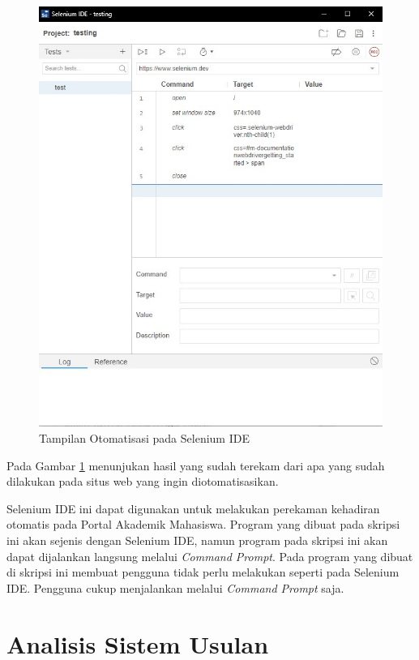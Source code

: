 \begin{enumerate}
\begin{figure}[H]
		\includegraphics[scale=0.5]{Gambar/testing.jpg}
		\caption{Tampilan Otomatisasi pada Selenium IDE} 
		\label{fig:testing}
	\end{figure}
	Pada Gambar \ref{fig:testing} menunjukan hasil yang sudah terekam dari apa yang sudah dilakukan pada situs web yang ingin diotomatisasikan.
\end{enumerate}
Selenium IDE ini dapat digunakan untuk melakukan perekaman kehadiran otomatis pada Portal Akademik Mahasiswa. Program yang dibuat pada skripsi ini akan sejenis dengan Selenium IDE, namun program pada skripsi ini akan dapat dijalankan langsung melalui \textit{Command Prompt}. Pada program yang dibuat di skripsi ini membuat pengguna tidak perlu melakukan seperti pada Selenium IDE. Pengguna cukup menjalankan melalui \textit{Command Prompt} saja.

\section{Analisis Sistem Usulan}

